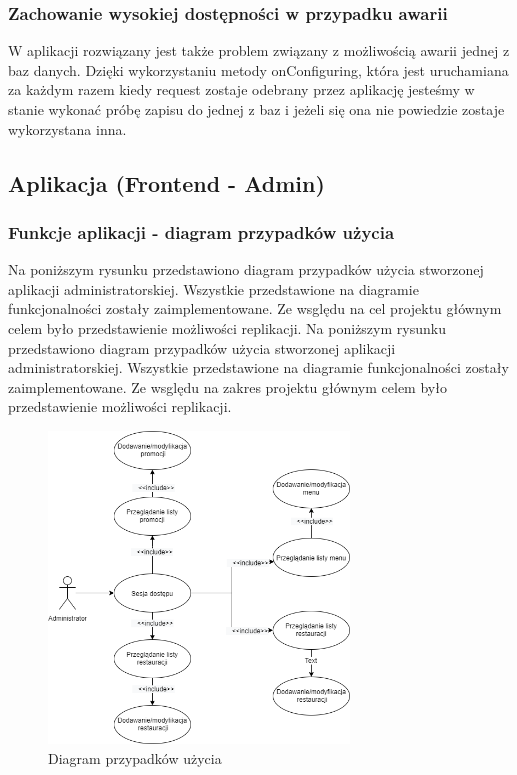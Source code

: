 \documentclass{article}
\begin{document}
		\subsubsection{Zachowanie wysokiej dostępności w przypadku awarii}
		W aplikacji rozwiązany jest także problem związany z możliwością awarii jednej z baz danych. Dzięki wykorzystaniu metody onConfiguring, która jest uruchamiana za każdym razem kiedy request zostaje odebrany przez aplikację jesteśmy w stanie wykonać próbę zapisu do jednej z baz i jeżeli się ona nie powiedzie zostaje wykorzystana inna.
	\newpage
\newpage
	\subsection{Aplikacja (Frontend - Admin)}
		\subsubsection{Funkcje aplikacji - diagram przypadków użycia}
		Na poniższym rysunku przedstawiono diagram przypadków użycia stworzonej aplikacji administratorskiej. Wszystkie przedstawione na diagramie funkcjonalności zostały zaimplementowane. Ze wsględu na cel projektu głównym celem było przedstawienie możliwości replikacji.
		Na poniższym rysunku przedstawiono diagram przypadków użycia stworzonej aplikacji administratorskiej. Wszystkie przedstawione na diagramie funkcjonalności zostały zaimplementowane. Ze wsględu na zakres projektu głównym celem było przedstawienie możliwości replikacji.
			\begin{figure}[hbt!]
				\includegraphics[width=8cm]{Files/Pictures/UMLAdminApp}
				\centering
				\caption{Diagram przypadków użycia}
			\end{figure}
\end{document}
